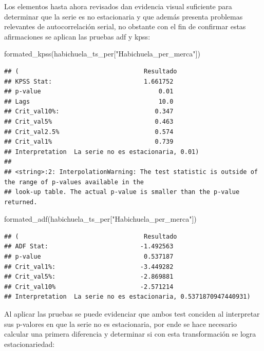 \documentclass[
]{book}
\newenvironment{Shaded}{\begin{snugshade}}{\end{snugshade}}
\newcommand{\NormalTok}[1]{#1}
\newcommand{\StringTok}[1]{\textcolor[rgb]{0.31,0.60,0.02}{#1}}
\begin{document}
Los elementos hasta ahora revisados dan evidencia visual suficiente para determinar que la serie es no estacionaria y que además presenta problemas relevantes de autocorrelación serial, no obstante con el fin de confirmar estas afirmaciones se aplican las pruebas adf y kpss:

\begin{Shaded}
\begin{Highlighting}[]

\NormalTok{formated\_kpss(habichuela\_ts\_per[}\StringTok{"Habichuela\_per\_merca"}\NormalTok{])}
\end{Highlighting}
\end{Shaded}

\begin{verbatim}
## (                                  Resultado
## KPSS Stat:                         1.661752
## p-value                                0.01
## Lags                                   10.0
## Crit_val10%:                          0.347
## Crit_val5%                            0.463
## Crit_val2.5%                          0.574
## Crit_val1%                            0.739
## Interpretation  La serie no es estacionaria, 0.01)
## 
## <string>:2: InterpolationWarning: The test statistic is outside of the range of p-values available in the
## look-up table. The actual p-value is smaller than the p-value returned.
\end{verbatim}

\begin{Shaded}
\begin{Highlighting}[]
\NormalTok{formated\_adf(habichuela\_ts\_per[}\StringTok{"Habichuela\_per\_merca"}\NormalTok{])}
\end{Highlighting}
\end{Shaded}

\begin{verbatim}
## (                                  Resultado
## ADF Stat:                         -1.492563
## p-value                            0.537187
## Crit_val1%:                       -3.449282
## Crit_val5%:                       -2.869881
## Crit_val10%                       -2.571214
## Interpretation  La serie no es estacionaria, 0.5371870947440931)
\end{verbatim}

Al aplicar las pruebas se puede evidenciar que ambos test conciden al interpretar sus p-valores en que la serie no es estacionaria, por ende se hace necesario calcular una primera diferencia y determinar si con esta transformación se logra estacionariedad:
\end{document}

